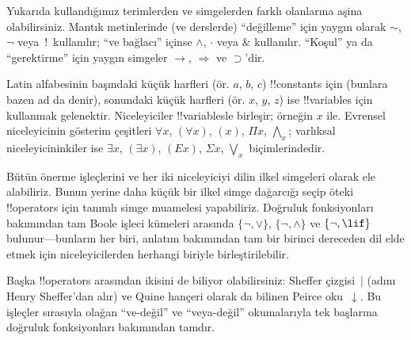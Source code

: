 \documentclass[../../../include/open-logic-section]{subfiles}
\begin{document}

\begin{intro}
Yukarıda kullandığımız terimlerden ve simgelerden farklı olanlarına
aşina olabilirsiniz. Mantık metinlerinde (ve derslerde) ``değilleme''
için yaygın olarak $\sim$, $\neg$ veya~!\ kullanılır; ``ve bağlacı'' içinse
$\wedge$, $\cdot$ veya $\&$ kullanılır. ``Koşul'' ya da ``gerektirme''
için yaygın simgeler $\rightarrow$, $\Rightarrow$ ve $\supset$'dir.

Latin alfabesinin başındaki küçük harfleri (ör. $a$, $b$, $c$)
!!{constant}s için (bunlara bazen ad da denir), sonundaki küçük harfleri
(ör. $x$, $y$, $z$) ise !!{variable}s için kullanmak gelenektir.
Niceleyiciler !!{variable}s{}le birleşir; örneğin $x$ ile. Evrensel
niceleyicinin gösterim çeşitleri $\forall x$, $(\forall x)$, $(x)$, $\Pi x$,
$\bigwedge_x$; varlıksal niceleyicininkiler ise $\exists x$, $(\exists
x)$, $(Ex)$, $\Sigma x$, $\bigvee_x$ biçimlerindedir.
\end{intro}

\begin{explain}
Bütün önerme işleçlerini ve her iki niceleyiciyi dilin ilkel simgeleri
olarak ele alabiliriz. Bunun yerine daha küçük bir ilkel simge dağarcığı
seçip öteki !!{operator}s için tanımlı simge muamelesi yapabiliriz. Doğruluk
fonksiyonları bakımından tam Boole işleci kümeleri arasında
$\{ \lnot, \lor \}$, $\{ \lnot, \land \}$ ve $\{ \lnot,
\lif\}$ bulunur---bunların her biri, anlatım bakımından tam bir birinci
dereceden dil elde etmek için niceleyicilerden herhangi biriyle
birleştirilebilir.

Başka !!{operator}s arasından ikisini de biliyor olabilirsiniz: Sheffer çizgisi~$|$
(adını Henry Sheffer'dan alır) ve Quine hançeri olarak da bilinen
Peirce oku~$\downarrow$. Bu işleçler sırasıyla olağan ``ve-değil'' ve
``veya-değil'' okumalarıyla tek başlarına doğruluk fonksiyonları
bakımından tamdır.
\end{explain}
\end{document}
